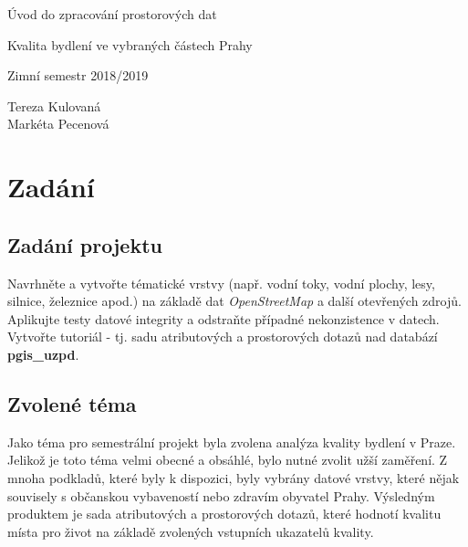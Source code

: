 \documentclass[a4paper, 12pt]{article}
\begin{document}
\begin{titlepage}
\begin{center}
\Huge
\vspace*{5.5cm}
Úvod do zpracování prostorových dat\\
\vspace{0.2cm}

\Large  
Kvalita bydlení ve vybraných částech Prahy\\
\vspace{0.2cm}

\normalsize  
Zimní semestr 2018/2019\\
\vspace{13cm}
\end{center}

\begin{flushright}
\Large
Tereza Kulovaná \\
Markéta Pecenová \\
\end{flushright}

\end{titlepage}


\pagestyle{plain}     %
\setcounter{page}{1}  %

\tableofcontents
\newpage

\section{Zadání}
\subsection{Zadání projektu}
Navrhněte a vytvořte tématické vrstvy (např. vodní toky, vodní plochy, lesy, silnice, železnice apod.) na základě dat \textit{OpenStreetMap} a další otevřených zdrojů. Aplikujte testy datové integrity a odstraňte případné nekonzistence v datech. Vytvořte tutoriál - tj. sadu atributových a prostorových dotazů nad databází \textbf{pgis\_uzpd}.

\subsection{Zvolené téma}
Jako téma pro semestrální projekt byla zvolena analýza kvality bydlení v Praze. Jelikož je toto téma velmi obecné a obsáhlé, bylo nutné zvolit užší zaměření. Z mnoha podkladů, které byly k dispozici, byly vybrány datové vrstvy, které nějak souvisely s občanskou vybaveností nebo zdravím obyvatel Prahy. Výsledným produktem je sada atributových a prostorových dotazů, které hodnotí kvalitu místa pro život na základě zvolených vstupních ukazatelů kvality. 
\clearpage
\end{document}
